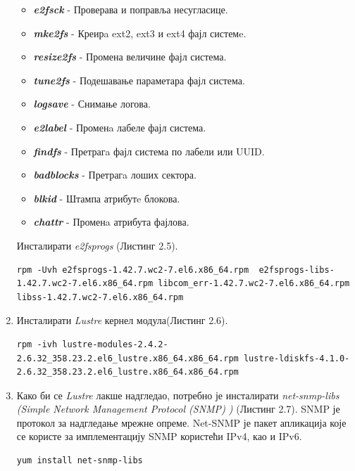 \begin{enumerate}
\begin{itemize}
\item \textbf{\textit{e2fsck}} - Проверава и поправља несугласице.
\item \textbf{\textit{mke2fs}} - Креирa ext2, ext3 и ext4 фајл системe.
\item \textbf{\textit{resize2fs}} - Промена величине фајл система.
\item \textbf{\textit{tune2fs}} - Подешавање параметара фајл система.
\item \textbf{\textit{logsave}} - Снимање логова.
\item \textbf{\textit{e2label}} - Променa лабеле фајл система.
\item \textbf{\textit{findfs}} - Претрагa фајл система по лабели или UUID.
\item \textbf{\textit{badblocks}} - Претрагa лоших сектора.
\item \textbf{\textit{blkid}} - Штампа атрибутe блокова.
\item \textbf{\textit{chattr}}  - Променa атрибута фајлова.
\end{itemize}

Инсталирати \textit{e2fsprogs} (Листинг 2.5).

\begin{lstlisting}[style=nonumbers,frame=single,caption=Инсталација \textit{e2fsprogs}]
rpm -Uvh e2fsprogs-1.42.7.wc2-7.el6.x86_64.rpm  e2fsprogs-libs-1.42.7.wc2-7.el6.x86_64.rpm libcom_err-1.42.7.wc2-7.el6.x86_64.rpm libss-1.42.7.wc2-7.el6.x86_64.rpm 
\end{lstlisting}

\item  Инсталирати   \textit{Lustre} кернел модула(Листинг 2.6).

\begin{lstlisting}[style=nonumbers,frame=single,caption=Инсталација кернел модула]
rpm -ivh lustre-modules-2.4.2-2.6.32_358.23.2.el6_lustre.x86_64.x86_64.rpm lustre-ldiskfs-4.1.0-2.6.32_358.23.2.el6_lustre.x86_64.x86_64.rpm
\end{lstlisting}

\item Како би се \textit{Lustre} лакше надгледао, потребно је инсталирати \textit{net-snmp-libs (Simple Network Management Protocol (\gls{SNMP}) )} (Листинг 2.7). SNMP је протокол за надгледање мрежне опреме. Net-SNMP је пакет апликација које се користе за имплементацију SNMP користећи IPv4, као и IPv6.

\begin{lstlisting}[style=nonumbers,frame=single,caption= Инсталација Net-SNMP-а]
yum install net-snmp-libs


\end{lstlisting}
\end{enumerate}
